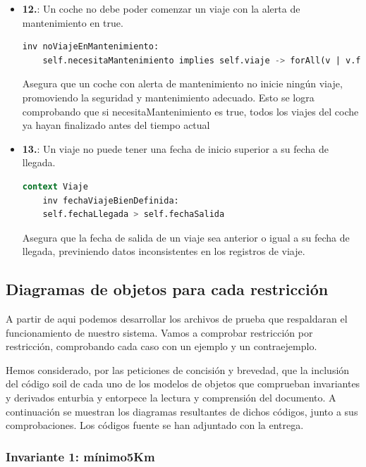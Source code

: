 \documentclass[12pt.a4paper]{article}
\begin{document}
\begin{itemize}
    \item \textbf{12.}: Un coche no debe poder comenzar un viaje con la alerta de mantenimiento en true.
    \begin{lstlisting}[style = useEspecifico,language=SQL]
    inv noViajeEnMantenimiento:
    self.necesitaMantenimiento implies self.viaje -> forAll(v | v.fechaLlegada < self.clock.NOW)   
    \end{lstlisting}
    Asegura que un coche con alerta de mantenimiento no inicie ningún viaje, promoviendo la seguridad y mantenimiento adecuado.
    Esto se logra comprobando que si necesitaMantenimiento es true, todos los viajes del coche ya hayan finalizado antes del tiempo actual 
    
    \item \textbf{13.}: Un viaje no puede tener una fecha de inicio superior a su fecha de llegada.
    \begin{lstlisting}[style = useEspecifico,language=SQL]
context Viaje
    inv fechaViajeBienDefinida:
    self.fechaLlegada > self.fechaSalida  
    \end{lstlisting}
    Asegura que la fecha de salida de un viaje sea anterior o igual a su fecha de llegada, previniendo datos inconsistentes en los registros de viaje.
\end{itemize}

\subsection{Diagramas de objetos para cada restricción}
A partir de aqui podemos desarrollar los archivos de prueba que respaldaran el funcionamiento de nuestro sistema. Vamos a comprobar restricción por restricción, comprobando cada caso con un ejemplo y un contraejemplo.

Hemos considerado, por las peticiones de concisión y brevedad, que la inclusión del código soil de cada uno de los modelos de objetos que comprueban invariantes y derivados enturbia y  entorpece la lectura y comprensión del documento. A continuación se muestran los diagramas resultantes de dichos códigos, junto a sus comprobaciones. Los códigos fuente se han adjuntado con la entrega.

\subsubsection{Invariante 1: mínimo5Km}
\end{document}
